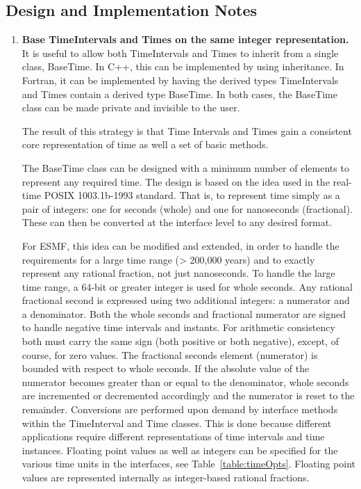 
\subsection{Design and Implementation Notes}
\begin{enumerate}

\item {\bf Base TimeIntervals and Times on the same integer representation.} 
It is useful to allow both TimeIntervals and Times to 
inherit from a single class, BaseTime.  In C++, this can be
implemented by using inheritance.  In Fortran, it can be implemented
by having the derived types TimeIntervals and Times
contain a derived type BaseTime.  In both cases, the 
BaseTime class can be made private and invisible to the user.

The result of this strategy is that Time Intervals and 
Times gain a consistent core representation of time as well a set
of basic methods.

The BaseTime class can be designed with a minimum number of elements
to represent any required time.  The design is based on the idea used
in the real-time POSIX 1003.1b-1993 standard.  That is, to represent
time simply as a pair of integers: one for seconds (whole) and one for
nanoseconds (fractional).  These can then be converted at the interface
level to any desired format.

For ESMF, this idea can be modified and extended, in order to handle the
requirements for a large time range (> 200,000 years) and to exactly
represent any rational fraction, not just nanoseconds.  To handle the
large time range, a 64-bit or greater integer is used for whole seconds.
Any rational fractional second is expressed using two additional integers:
a numerator and a denominator.  Both the whole seconds and fractional
numerator are signed to handle negative time intervals and instants.
For arithmetic consistency both must carry the same sign (both positive
or both negative), except, of course, for zero values.  The fractional
seconds element (numerator) is bounded with respect to whole seconds. 
If the absolute value of the
numerator becomes greater than or equal to the denominator, whole
seconds are incremented or decremented accordingly and the numerator is
reset to the remainder.  Conversions are performed upon demand by
interface methods within the TimeInterval and
Time classes.  This is done because different applications require different
representations of time intervals and time instances.  Floating point values as well as integers can be specified for the various time units in the interfaces, see Table~\ref{table:timeOpts}.  Floating point values are represented internally as integer-based rational fractions.


\end{enumerate}
